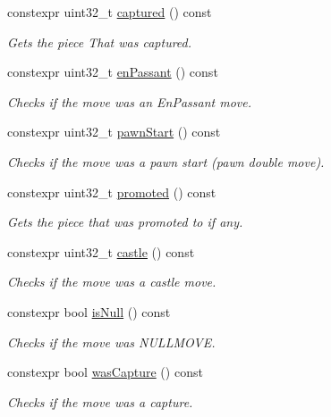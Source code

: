 \begin{DoxyCompactItemize}
constexpr uint32\+\_\+t \mbox{\hyperlink{classMove_a5a8811a7e6ee7fe36675d49038f2ea2b}{captured}} () const
\begin{DoxyCompactList}\small\item\em Gets the piece That was captured. \end{DoxyCompactList}\item 
constexpr uint32\+\_\+t \mbox{\hyperlink{classMove_a69a64f5ba158cf0f48765ea40de0daf0}{en\+Passant}} () const
\begin{DoxyCompactList}\small\item\em Checks if the move was an En\+Passant move. \end{DoxyCompactList}\item 
constexpr uint32\+\_\+t \mbox{\hyperlink{classMove_ae9eaee49438859900541d7a308161a8b}{pawn\+Start}} () const
\begin{DoxyCompactList}\small\item\em Checks if the move was a pawn start (pawn double move). \end{DoxyCompactList}\item 
constexpr uint32\+\_\+t \mbox{\hyperlink{classMove_a68741632b4a38ae64152541ed3c641ae}{promoted}} () const
\begin{DoxyCompactList}\small\item\em Gets the piece that was promoted to if any. \end{DoxyCompactList}\item 
constexpr uint32\+\_\+t \mbox{\hyperlink{classMove_a35d7341c2a9074102451bf4df0d8b4c2}{castle}} () const
\begin{DoxyCompactList}\small\item\em Checks if the move was a castle move. \end{DoxyCompactList}\item 
constexpr bool \mbox{\hyperlink{classMove_ac986baf2580e64f47828c8adf23a25f0}{is\+Null}} () const
\begin{DoxyCompactList}\small\item\em Checks if the move was N\+U\+L\+L\+M\+O\+VE. \end{DoxyCompactList}\item 
constexpr bool \mbox{\hyperlink{classMove_aa270da1cc5c6f10882cd14e9a61d2ebe}{was\+Capture}} () const
\begin{DoxyCompactList}\small\item\em Checks if the move was a capture. \end{DoxyCompactList}\item 

\end{DoxyCompactItemize}
